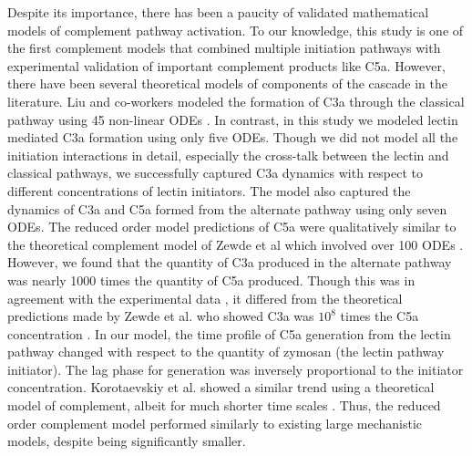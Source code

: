 \documentclass[12pt]{article}
\begin{document}
Despite its importance, there has been a paucity of validated mathematical models of complement pathway activation.
To our knowledge, this study is one of the first complement models that combined multiple initiation pathways with experimental validation of important complement products like C5a.
However, there have been several theoretical models of components of the cascade in the literature.
Liu and co-workers modeled the formation of C3a through the classical pathway using 45 non-linear ODEs  \cite{liu2011computational}.
In contrast, in this study we modeled lectin mediated C3a formation using only five ODEs.
Though we did not model all the initiation interactions in detail, especially the cross-talk between the lectin and classical pathways,
we successfully captured C3a dynamics with respect to different concentrations of lectin initiators.
The model also captured the dynamics of C3a and C5a formed from the alternate pathway using only seven ODEs.
The reduced order model predictions of C5a were qualitatively similar to the theoretical complement model of Zewde et al which involved over 100 ODEs \cite{zewde2016quantitative}.
However, we found that the quantity of C3a produced in the alternate pathway was nearly 1000 times the quantity of C5a produced.
Though this was in agreement with the experimental data \cite{morad2015time},
it differed from the theoretical predictions made by Zewde et al. who showed C3a was ${10^8}$ times the C5a concentration \cite{zewde2016quantitative}.
In our model, the time profile of C5a generation from the lectin pathway changed with respect to the quantity of zymosan (the lectin pathway initiator).
The lag phase for generation was inversely proportional to the initiator concentration.
Korotaevskiy et al. showed a similar trend using a theoretical model of complement, albeit for much shorter time scales \cite{korotaevskiy2009non}.
Thus, the reduced order complement model performed similarly to existing large mechanistic models, despite being significantly smaller.
\end{document}
